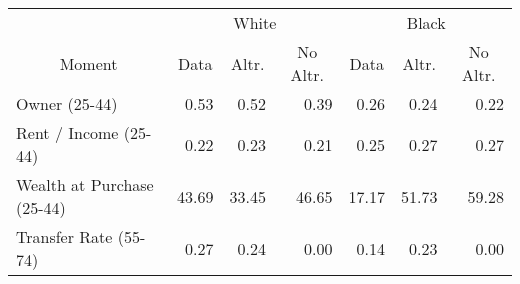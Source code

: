 \begin{tabular}{l rrr rrr}
\toprule & \multicolumn{3}{c}{White} & \multicolumn{3}{c}{Black} \\ \cmidrule(lr){2-4}\cmidrule(lr){5-7}
\multicolumn{1}{c}{Moment} & \multicolumn{1}{c}{Data} & \multicolumn{1}{c}{Altr.} & \multicolumn{1}{c}{No Altr.} & \multicolumn{1}{c}{Data} & \multicolumn{1}{c}{Altr.} & \multicolumn{1}{c}{No Altr.}\\
\midrule
\;Owner (25-44) & 0.53 & 0.52 & 0.39 & 0.26 & 0.24 & 0.22\\
\;Rent / Income (25-44) & 0.22 & 0.23 & 0.21 & 0.25 & 0.27 & 0.27\\
\;Wealth at Purchase (25-44) & 43.69 & 33.45 & 46.65 & 17.17 & 51.73 & 59.28\\
\;Transfer Rate (55-74) & 0.27 & 0.24 & 0.00 & 0.14 & 0.23 & 0.00\\
\bottomrule
\end{tabular}

